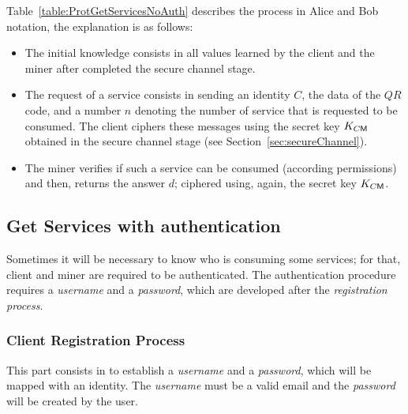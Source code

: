Table~\ref{table:ProtGetServicesNoAuth} describes the process in
Alice and Bob notation, the explanation is as follows:  
\begin{itemize}
  \item  The initial knowledge consists in all values learned by the client and the miner 
        after completed the secure channel stage.
   \item The request of a service consists in sending an identity $C$, the data of the $QR$ code, and a 
        number $n$ denoting the number of service that is requested to be consumed. 
        The client ciphers  these messages using the secret key $K_{C\textsf{M}}$ obtained in
        the secure channel stage (see Section~\ref{sec:secureChannel}).
   \item The miner verifies if such a service can be consumed (according permissions) and then, 
        returns the answer $d$; ciphered using, again, the secret key $K_{C\textsf{M}}$.
\end{itemize}




\subsection{Get Services with authentication}
\label{ssec:ServAuth}
Sometimes it will be necessary to know who is consuming some services; for that, client and
miner are required to be authenticated. The authentication procedure requires a \textit{username} 
and a \textit{password}, which are developed after the \textit{registration process}. 


\subsubsection{Client Registration Process}
\label{sec:Registration}

This part consists in to establish a \textit{username} and a \textit{password}, which
will be mapped with an identity. The \textit{username} must be a valid email and the 
\textit{password} will be created by the user.


